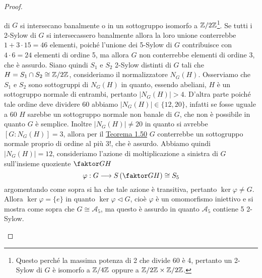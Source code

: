 \documentclass[11pt]{scrartcl}
\begin{document}
\begin{proof}
\begin{itemize}
        di $G$ si intersecano banalmente 
        o in un sottogruppo isomorfo a $\mathbb{Z}/{2}\mathbb{Z}$\footnote{
            Questo perché la massima potenza di 2 che divide 60 è 4, pertanto
            un 2-Sylow di $G$ è isomorfo a $\mathbb{Z}/{4}\mathbb{Z}$ oppure a $\mathbb{Z}/{2}\mathbb{Z}\times \mathbb{Z}/{2}\mathbb{Z}$.
        }. Se tutti i 2-Sylow di $G$ si intersecassero banalmente allora la 
        loro unione conterrebbe $1 + 3\cdot 15 = 46$ elementi, poiché l'unione dei
        5-Sylow di $G$ contribuisce con $4\cdot 6 = 24$ elementi di ordine 5,
        ma allora $G$ non conterrebbe elementi di ordine 3, che è assurdo.
        Siano quindi $S_1$ e $S_2$ 2-Sylow distinti di $G$ tali che 
        $H = S_1\cap S_2 \cong \mathbb{Z}/{2}\mathbb{Z}$, consideriamo il normalizzatore $N_G(H)$.
        Osserviamo che $S_1$ e $S_2$ sono sottogruppi di $N_G(H)$ in quanto, essendo
        abeliani, $H$ è un sottogruppo normale di entrambi, pertanto $|N_G(H)| > 4$.
        D'altra parte poiché tale ordine deve dividere 60 abbiamo 
        $|N_G(H)| \in \{12, 20\}$, infatti se fosse uguale a 60 $H$ sarebbe un 
        sottogruppo normale non banale di $G$, che non è possibile in quanto $G$
        è semplice. Inoltre $|N_G(H)| \neq 20$ in quanto si avrebbe $[G:N_G(H)] = 3$,
        allora per il \hyperref[teorema3.0]{Teorema 1.50} $G$ conterrebbe
        un sottogruppo normale proprio di ordine al più $3!$, che è assurdo.
        Abbiamo quindi $|N_G(H)| = 12$, consideriamo l'azione di 
        moltiplicazione a sinistra di $G$ sull'insieme quoziente $\faktor G H$
        \[
            \varphi : G\longrightarrow S\left(\faktor G H\right)\cong S_5
        \]
        argomentando come sopra si ha che tale azione è transitiva, pertanto
        $\ker\varphi \neq G$. Allora $\ker\varphi = \{e\}$ in quanto 
        $\ker\varphi\triangleleft G$, cioè $\varphi$ è un omomorfismo iniettivo
        e si mostra come sopra che $G \cong \mathcal{A}_5$, ma questo è assurdo 
        in quanto $\mathcal{A}_5$ contiene 5 2-Sylow.
    \end{itemize}
\end{proof}
\end{document}
